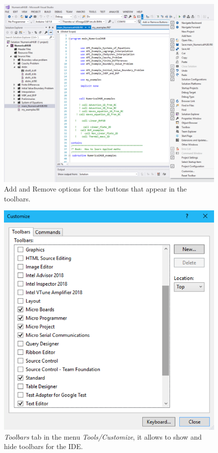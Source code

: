 \begin{figure}[h]
    \centering
    \includegraphics[width=\textwidth]{Figures/Config2}
    \caption{Add and Remove options for the buttons that appear in the toolbars.}
    \label{fig:Config2}
\end{figure}

\begin{figure}[h]
    \centering
    \includegraphics[width= \textwidth]{Figures/Config3}
    \caption{\textit{Toolbars} tab in the menu \textit{Tools/Customize}, it allows to show and hide toolbars for the IDE.}
    \label{fig:Config3}
\end{figure}

